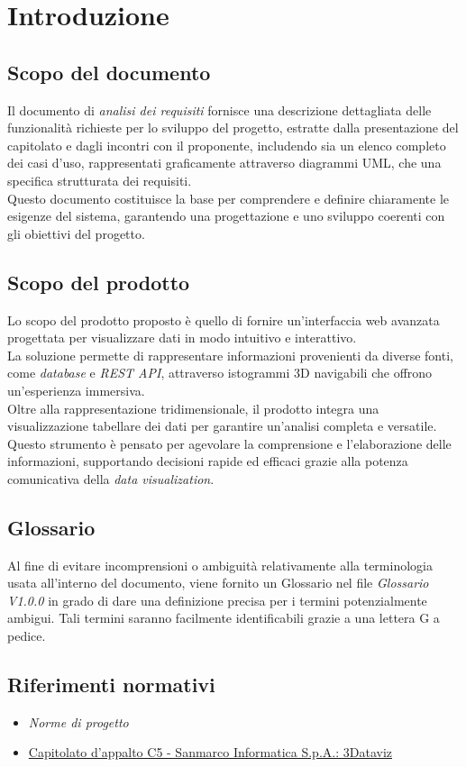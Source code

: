 \section{Introduzione}
\subsection{Scopo del documento}
Il documento di \textit{analisi dei requisiti} fornisce una descrizione dettagliata 
delle funzionalità richieste per lo sviluppo del progetto, estratte dalla presentazione del capitolato e dagli incontri con il proponente,
 includendo sia un elenco completo dei casi d'uso, rappresentati graficamente attraverso 
diagrammi UML, che una specifica strutturata dei requisiti.\\
Questo documento costituisce la base per comprendere e definire chiaramente le esigenze del 
sistema, garantendo una progettazione e uno sviluppo coerenti con gli 
obiettivi del progetto.
\subsection{Scopo del prodotto}
Lo scopo del prodotto proposto è quello di fornire un'interfaccia web avanzata progettata per visualizzare 
dati in modo intuitivo e interattivo.\\ La soluzione permette di rappresentare 
informazioni provenienti da diverse fonti, come \textit{database} e \textit{REST API}, 
attraverso istogrammi 3D navigabili che offrono un'esperienza immersiva.\\ Oltre 
alla rappresentazione tridimensionale, il prodotto integra una visualizzazione 
tabellare dei dati per garantire un'analisi completa e versatile.\\Questo strumento 
è pensato per agevolare la comprensione e l’elaborazione delle informazioni, 
supportando decisioni rapide ed efficaci grazie alla potenza comunicativa della 
\textit{data visualization}.
\subsection{Glossario}
Al fine di evitare incomprensioni o ambiguità relativamente alla terminologia
usata all'interno del documento, viene fornito un Glossario nel file
\textit{Glossario V1.0.0} in grado di dare una definizione precisa per i
termini potenzialmente ambigui. Tali termini saranno facilmente identificabili
grazie a una lettera G a pedice.
\subsection{Riferimenti normativi}
\begin{itemize}
      \item {\textit{Norme di progetto}}
      \item \href{https://www.math.unipd.it/~tullio/IS-1/2024/Progetto/C5.pdf}
            {Capitolato d'appalto C5 - Sanmarco Informatica S.p.A.: 3Dataviz}
\end{itemize}
